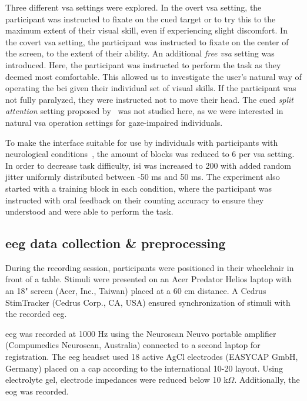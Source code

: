 \documentclass{article}
\begin{document}
Three different \ac{vsa} settings were explored.
In the overt \ac{vsa} setting, the participant was instructed to fixate on the cued target or
to try this to the maximum extent of their visual skill, even if experiencing
slight discomfort.
In the covert \ac{vsa} setting, the participant was instructed to fixate on the center of the
screen, to the extent of their ability.
An additional \emph{free \ac{vsa}} setting was introduced.
Here, the participant was instructed to perform the task as they deemed most
comfortable.
This allowed us to investigate the user's natural way of operating the \ac{bci}
given their individual set of visual skills.
If the participant was not fully paralyzed, they were instructed not to move their head.
The cued \emph{split attention} setting proposed
by~\textcite{VanDenKerchove2024} was not studied here, as we were interested
in natural \ac{vsa} operation settings for gaze-impaired individuals.

To make the interface suitable for use by individuals with
participants with neurological conditions~\cite{FriedOken2020}, the amount of blocks was reduced to 6 per \ac{vsa} setting.
In order to decrease task difficulty, \ac{isi} was increased to 200 with added random jitter uniformly distributed
between -50 ms and 50 ms.
The experiment also started with a training block in each condition, where the
participant was instructed with oral feedback on their counting accuracy to ensure they
understood and were able to perform the task.


\subsection{\Ac{eeg} data collection \& preprocessing}

During the recording session, participants were positioned in their wheelchair in front of a table.
Stimuli were presented on an Acer Predator Helios laptop with an 18" screen (Acer,
Inc., Taiwan) placed at a 60 cm distance.
A Cedrus StimTracker (Cedrus Corp., CA, USA) ensured synchronization of stimuli with the
recorded \ac{eeg}.

\Ac{eeg} was recorded at 1000 Hz using the Neuroscan Neuvo portable amplifier (Compumedics Neuroscan,
Australia) connected to a second laptop for registration.
The \ac{eeg} headset used 18 active AgCl electrodes (EASYCAP GmbH, Germany) placed on a cap
according to the international 10-20 layout.
Using electrolyte gel, electrode impedances were reduced below 10 k$\Omega$.
Additionally, the \ac{eog} was recorded.
\end{document}
